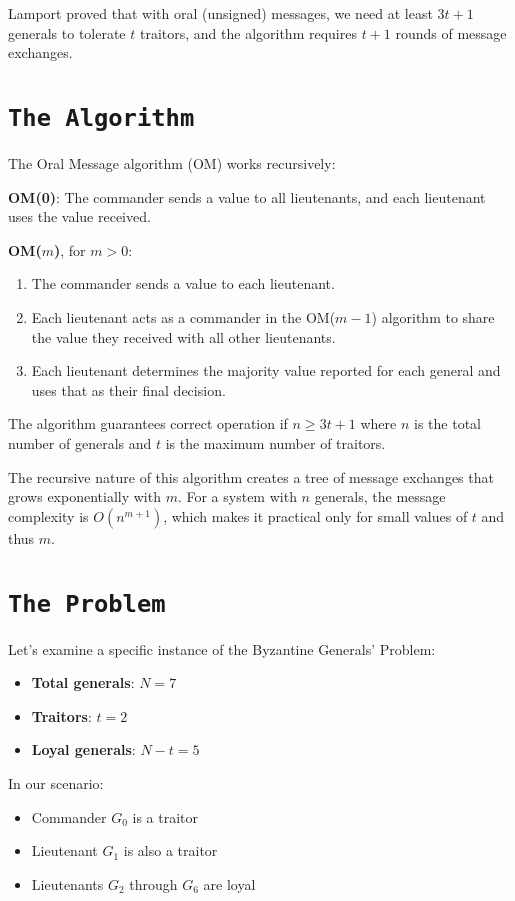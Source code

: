 \documentclass[11pt]{article}
\begin{document}
Lamport proved that with oral (unsigned) messages, we need at least $3t+1$ generals to tolerate $t$ traitors, and the algorithm requires $t+1$ rounds of message exchanges.

\section*{\texttt{\Large The Algorithm}}
\justifying
The Oral Message algorithm (OM) works recursively:

\textbf{OM(0)}: The commander sends a value to all lieutenants, and each lieutenant uses the value received.

\textbf{OM($m$)}, for $m > 0$:
\begin{enumerate}
    \item The commander sends a value to each lieutenant.
    \item Each lieutenant acts as a commander in the OM($m-1$) algorithm to share the value they received with all other lieutenants.
    \item Each lieutenant determines the majority value reported for each general and uses that as their final decision.
\end{enumerate}

The algorithm guarantees correct operation if $n \geq 3t+1$ where $n$ is the total number of generals and $t$ is the maximum number of traitors.

The recursive nature of this algorithm creates a tree of message exchanges that grows exponentially with $m$. For a system with $n$ generals, the message complexity is $O(n^{m+1})$, which makes it practical only for small values of $t$ and thus $m$.

\section*{\texttt{\Large The Problem}}
\justifying
Let's examine a specific instance of the Byzantine Generals' Problem:

\begin{itemize}
    \item \textbf{Total generals}: $N = 7$
    \item \textbf{Traitors}: $t = 2$
    \item \textbf{Loyal generals}: $N - t = 5$
\end{itemize}

In our scenario:
\begin{itemize}
    \item Commander $G_0$ is a traitor
    \item Lieutenant $G_1$ is also a traitor
    \item Lieutenants $G_2$ through $G_6$ are loyal
\end{itemize}
\end{document}
